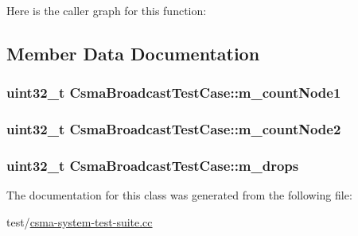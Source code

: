 Here is the caller graph for this function\+:




\subsection{Member Data Documentation}
\subsubsection[{\texorpdfstring{m\+\_\+count\+Node1}{m_countNode1}}]{\setlength{\rightskip}{0pt plus 5cm}uint32\+\_\+t Csma\+Broadcast\+Test\+Case\+::m\+\_\+count\+Node1\hspace{0.3cm}{\ttfamily [private]}}\hypertarget{classCsmaBroadcastTestCase_aa15ff3c6a8d87b8544c819603b374e26}{}\label{classCsmaBroadcastTestCase_aa15ff3c6a8d87b8544c819603b374e26}
\subsubsection[{\texorpdfstring{m\+\_\+count\+Node2}{m_countNode2}}]{\setlength{\rightskip}{0pt plus 5cm}uint32\+\_\+t Csma\+Broadcast\+Test\+Case\+::m\+\_\+count\+Node2\hspace{0.3cm}{\ttfamily [private]}}\hypertarget{classCsmaBroadcastTestCase_a5bd024434bfba4fa0f4cc00bf2b733eb}{}\label{classCsmaBroadcastTestCase_a5bd024434bfba4fa0f4cc00bf2b733eb}
\subsubsection[{\texorpdfstring{m\+\_\+drops}{m_drops}}]{\setlength{\rightskip}{0pt plus 5cm}uint32\+\_\+t Csma\+Broadcast\+Test\+Case\+::m\+\_\+drops\hspace{0.3cm}{\ttfamily [private]}}\hypertarget{classCsmaBroadcastTestCase_aabf862862c62a9c79b6a9addf8d42f13}{}\label{classCsmaBroadcastTestCase_aabf862862c62a9c79b6a9addf8d42f13}


The documentation for this class was generated from the following file\+:\begin{DoxyCompactItemize}
\item 
test/\hyperlink{csma-system-test-suite_8cc}{csma-\/system-\/test-\/suite.\+cc}\end{DoxyCompactItemize}
